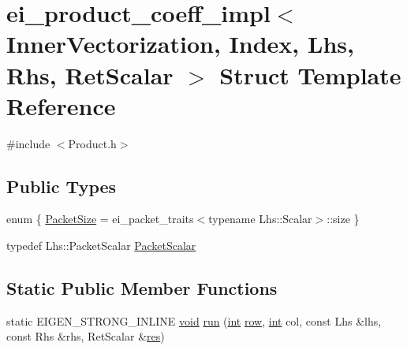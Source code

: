 \hypertarget{structei__product__coeff__impl_3_01_inner_vectorization_00_01_index_00_01_lhs_00_01_rhs_00_01_ret_scalar_01_4}{\section{ei\-\_\-product\-\_\-coeff\-\_\-impl$<$ Inner\-Vectorization, Index, Lhs, Rhs, Ret\-Scalar $>$ Struct Template Reference}
\label{structei__product__coeff__impl_3_01_inner_vectorization_00_01_index_00_01_lhs_00_01_rhs_00_01_ret_scalar_01_4}
}


{\ttfamily \#include $<$Product.\-h$>$}

\subsection*{Public Types}
\begin{DoxyCompactItemize}
\item 
enum \{ \hyperlink{structei__product__coeff__impl_3_01_inner_vectorization_00_01_index_00_01_lhs_00_01_rhs_00_01_ret_scalar_01_4_aed075377be4c8c8995a6f6ee83249440a0a443825b7e50f17f1050b37b9a358bd}{Packet\-Size} = ei\-\_\-packet\-\_\-traits$<$typename Lhs\-:\-:Scalar$>$\-:\-:size
 \}
\item 
typedef Lhs\-::\-Packet\-Scalar \hyperlink{structei__product__coeff__impl_3_01_inner_vectorization_00_01_index_00_01_lhs_00_01_rhs_00_01_ret_scalar_01_4_a5cda08de18a97d0acd724abeecf02be6}{Packet\-Scalar}
\end{DoxyCompactItemize}
\subsection*{Static Public Member Functions}
\begin{DoxyCompactItemize}
\item 
static E\-I\-G\-E\-N\-\_\-\-S\-T\-R\-O\-N\-G\-\_\-\-I\-N\-L\-I\-N\-E \hyperlink{group___u_a_v_objects_plugin_ga444cf2ff3f0ecbe028adce838d373f5c}{void} \hyperlink{structei__product__coeff__impl_3_01_inner_vectorization_00_01_index_00_01_lhs_00_01_rhs_00_01_ret_scalar_01_4_a887ff1fef9ea0f498a6d91125d9304bb}{run} (\hyperlink{ioapi_8h_a787fa3cf048117ba7123753c1e74fcd6}{int} \hyperlink{glext_8h_a11b277b422822f784ee248b43eee3e1e}{row}, \hyperlink{ioapi_8h_a787fa3cf048117ba7123753c1e74fcd6}{int} col, const Lhs \&lhs, const Rhs \&rhs, Ret\-Scalar \&\hyperlink{glext_8h_a1dbb21208b9047cc8031ca9c840d3c2f}{res})
\end{DoxyCompactItemize}


